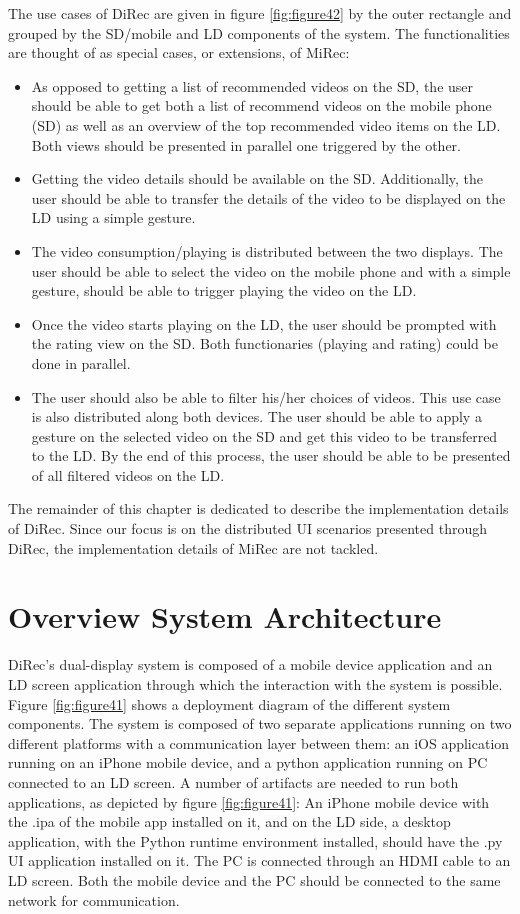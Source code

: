 The use cases of DiRec are given in figure \ref{fig:figure42} by the outer
rectangle and grouped by the SD/mobile and LD components of the system. The
functionalities are thought of as special cases, or extensions, of MiRec:
\begin{itemize}
	\item As opposed to getting a list of recommended videos on the SD, the user
	should be able to get both a list of recommend videos on the mobile phone (SD)
	as well as an overview of the top recommended video items on the LD. Both views should be presented in parallel one triggered by the other.
	\item Getting the video details should be available on the SD. Additionally, the user should be able to transfer the details of the video to be displayed on the LD using a simple gesture. 
	\item The video consumption/playing is distributed between the two displays. The user should be able to select the video on the mobile phone and with a simple gesture, should be able to trigger playing the video on the LD.
 \item Once the video starts playing on the LD, the user should be prompted with the rating view on the SD. Both functionaries (playing and rating) could be done in parallel.
 \item The user should also be able to filter his/her choices of videos. This use case is also distributed along both devices. The user should be able to apply a gesture on the selected video on the SD and get this video to be transferred to the LD. By the end of this process, the user should be able to be presented of all filtered videos on the LD. 
\end{itemize} 
The remainder of this chapter is dedicated to describe the implementation
details of DiRec. Since our focus is on the distributed UI scenarios
presented through DiRec, the implementation details of MiRec are not tackled.

\section{Overview System Architecture}
DiRec's dual-display system is composed of a mobile device application and an LD
screen application through which the interaction with the system is possible.
Figure \ref{fig:figure41} shows a deployment diagram of the different system components. The system is composed of two separate applications running on two different platforms with a communication layer between them: an iOS application running on an iPhone mobile device, and a python application running on PC connected to an LD screen.  A number of artifacts are needed to run both applications, as depicted by figure \ref{fig:figure41}: An iPhone mobile device with the .ipa of the mobile app installed on it, and on the LD side, a desktop application, with the Python runtime environment installed, should have the .py UI application installed on it. The PC is connected through an HDMI cable to an LD screen. Both the mobile device and the PC should be connected to the same network for communication.
    
